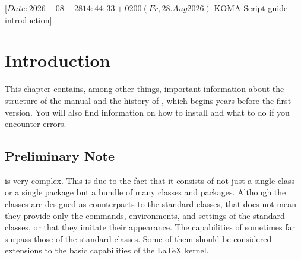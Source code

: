 %
%
%
%
%
%
%

                 [$Date: 2026-08-28 14:44:33 +0200 (Fr, 28. Aug 2026) $
                  KOMA-Script guide introduction]

\chapter{Introduction}

This chapter contains, among other things, important information about the 
structure of the manual and the history of {\KOMAScript}, which begins 
years before the first version. You will also find information on how to
install {\KOMAScript} and what to do if you encounter errors.

\section{Preliminary Note}

{\KOMAScript} is very complex. This is due to the fact that it consists of not
just a single class or a single package but a bundle of many classes and
packages. Although the classes are designed as counterparts to the standard
classes, that does not mean they provide only the commands, environments, and
settings of the standard classes, or that they imitate their appearance. The
capabilities of {\KOMAScript} sometimes far surpass those of the standard
classes. Some of them should be considered extensions to the basic
capabilities of the \LaTeX{} kernel.

